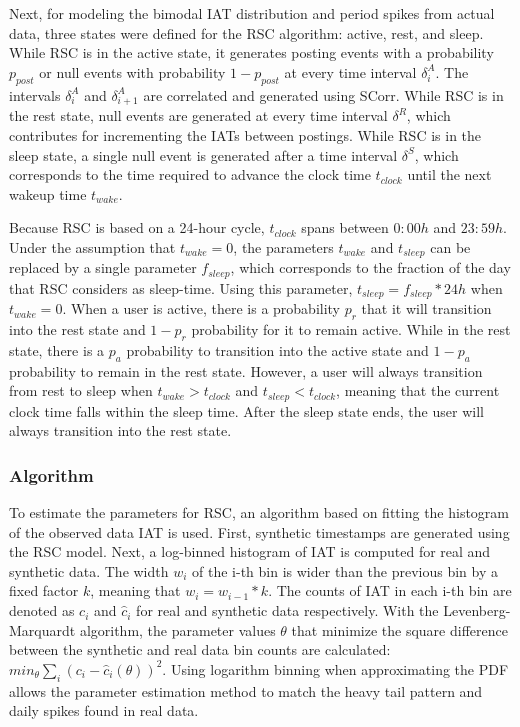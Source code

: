 \documentclass[11pt, oneside]{article}   	%
\begin{document}
\quad Next, for modeling the bimodal IAT distribution and period spikes from actual data, three states were defined for the RSC algorithm: active, rest, and sleep.
While RSC is in the active state, it generates posting events with a probability $p_{post}$ or null events with probability $1-p_{post}$ at every time interval $\delta_i^A$.
The intervals $\delta_i^A$ and $\delta_{i+1}^A$ are correlated and generated using SCorr.
While RSC is in the rest state, null events are generated at every time interval $\delta^R$, which contributes for incrementing the IATs between postings.
While RSC is in the sleep state, a single null event is generated after a time interval $\delta^S$, which corresponds to the time required to advance the clock time $t_{clock}$ until the next wakeup time $t_{wake}$.

\quad Because RSC is based on a 24-hour cycle, $t_{clock}$ spans between $0:00h$ and $23:59h$.
Under the assumption that $t_{wake}=0$, the parameters $t_{wake}$ and $t_{sleep}$ can be replaced by a single parameter $f_{sleep}$, which corresponds to the fraction of the day that RSC considers as sleep-time.
Using this parameter, $t_{sleep}=f_{sleep}*24h$ when $t_{wake}=0$.
When a user is active, there is a probability $p_r$ that it will transition into the rest state and $1-p_r$ probability for it to remain active.
While in the rest state, there is a $p_a$ probability to transition into the active state and $1-p_a$ probability to remain in the rest state.
However, a user will always transition from rest to sleep when $t_{wake} > t_{clock}$ and $t_{sleep} < t_{clock}$, meaning that the current clock time falls within the sleep time.
After the sleep state ends, the user will always transition into the rest state.

\subsubsection*{Algorithm}

\quad To estimate the parameters for RSC, an algorithm based on fitting the histogram of the observed data IAT is used.
First, synthetic timestamps are generated using the RSC model.
Next, a log-binned histogram of IAT is computed for real and synthetic data.
The width $w_i$ of the i-th bin is wider than the previous bin by a fixed factor $k$, meaning that $w_i=w_{i-1}*k$.
The counts of IAT in each i-th bin are denoted as $c_i$ and $\hat{c}_i$ for real and synthetic data respectively.
With the Levenberg-Marquardt algorithm, the parameter values $\theta$ that minimize the square difference between the synthetic and real data bin counts are calculated: $min_{\theta} \sum_i (c_i - \hat{c}_i(\theta))^2$.
Using logarithm binning when approximating the PDF allows the parameter estimation method to match the heavy tail pattern and daily spikes found in real data.
\end{document}
